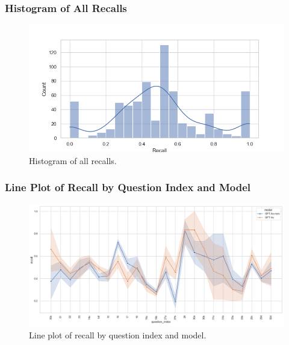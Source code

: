             \subsubsection{Histogram of All Recalls}
            \begin{figure}[H]
                \centering
                \includegraphics[scale=0.75]{images_exp2/recall/hist_recall_all.png}
                \caption{Histogram of all recalls.}
                \label{fig:hist_recall_all}
            \end{figure}

            \subsubsection{Line Plot of Recall by Question Index and Model}
            \begin{figure}[H]
                \centering
                \includegraphics[width=\textwidth]{images_exp2/recall/line_recall_by_question_index_and_model.png}
                \caption{Line plot of recall by question index and model.}
                \label{fig:line_recall_by_question_index_and_model}
            \end{figure}



